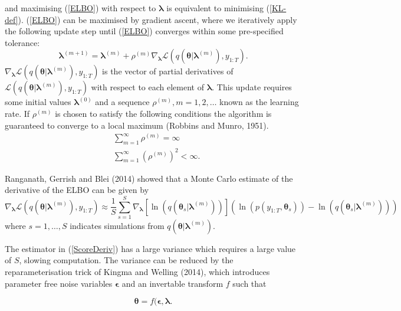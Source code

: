 \documentclass[12pt,a4paper]{article}%
\numberwithin{equation}{section}
\begin{document}
and maximising (\ref{ELBO}) with respect to $\boldsymbol{\lambda}$ is equivalent to minimising (\ref{KL-def}). (\ref{ELBO}) can be maximised by gradient ascent, where we iteratively apply the following update step until (\ref{ELBO}) converges within some pre-specified tolerance:
\begin{equation}
\label{GradAscent}
\boldsymbol{\lambda}^{(m+1)} = \boldsymbol{\lambda}^{(m)} + \rho^{(m)} \nabla_{\boldsymbol{\lambda}} \mathcal{L}(q(\boldsymbol{\theta} | \boldsymbol{\lambda}^{(m)}), y_{1:T}).
\end{equation}
$\nabla_{\boldsymbol{\lambda}}\mathcal{L}(q(\boldsymbol{\theta} | \boldsymbol{\lambda}^{(m)}), y_{1:T})$ is the vector of partial derivatives of $\mathcal{L}(q(\boldsymbol{\theta} | \boldsymbol{\lambda}^{(m)}), y_{1:T})$ with respect to each element of $\boldsymbol{\lambda}$. This update requires some initial values $\boldsymbol{\lambda}^{(0)}$ and a sequence $\rho^{(m)}, m = 1, 2, \dots$ known as the learning rate. If $\rho^{(m)}$ is chosen to satisfy the following conditions the algorithm is guaranteed to converge to a local maximum (Robbins and Munro, 1951).
\begin{align}
&\sum_{m=1}^{\infty} \rho^{(m)} =  \infty \\
&\sum_{m=1}^{\infty} (\rho^{(m)})^2 <  \infty.
\end{align}

Ranganath, Gerrish and Blei (2014) showed that a Monte Carlo estimate of the derivative of the ELBO can be given by
\begin{equation}
\label{ScoreDeriv}
\nabla_{\boldsymbol{\lambda}}\mathcal{L}(q(\boldsymbol{\theta} | \boldsymbol{\lambda}^{(m)}), y_{1:T}) \approx \frac{1}{S}\sum_{s=1}^{S} \nabla_{\boldsymbol{\lambda}} [\ln(q(\boldsymbol{\theta}_s | \boldsymbol{\lambda}^{(m)}))] (\ln (p(y_{1:T}, \boldsymbol{\theta}_s)) - \ln(q(\boldsymbol{\theta}_s | \boldsymbol{\lambda}^{(m)})))
\end{equation}
where $s = 1, \dots, S$ indicates simulations from $q(\boldsymbol{\theta} | \boldsymbol{\lambda}^{(m)})$.

The estimator in (\ref{ScoreDeriv}) has a large variance which requires a large value of $S$, slowing computation. The variance can be reduced by the reparameterisation trick of Kingma and Welling (2014), which introduces parameter free noise variables $\boldsymbol{\epsilon}$ and an invertable transform $f$ such that

\begin{equation}
\label{Reparam}
\boldsymbol{\theta} = f(\boldsymbol{\epsilon}, \boldsymbol{\lambda}.
\end{equation}
\end{document}
